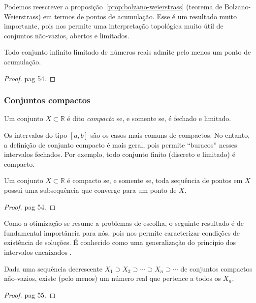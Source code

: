 Podemos reescrever a proposição~\ref{prop:bolzano-weierstrass} (teorema de Bolzano-Weierstrass) em termos de pontos de acumulação. Esse é um resultado muito importante, pois nos permite uma interpretação topológica muito útil de conjuntos não-vazios, abertos e limitados.

\begin{teorema}
	Todo conjunto infinito limitado de números reais admite pelo menos um ponto de acumulação.
	\begin{proof}
		\cite{elonAnalise1} pag 54.
	\end{proof}
\end{teorema}

\subsubsection{Conjuntos compactos}

\begin{definicao}
	Um conjunto $X\subset \mathbb{R}$ é dito \textit{compacto} se, e somente se, é fechado e limitado.
\end{definicao}

\begin{exemplo}
	Os intervalos do tipo $[a,b]$ são os casos mais comuns de compactos. No entanto, a definição de conjunto compacto é mais geral, pois permite ``buracos'' nesses intervalos fechados. Por exemplo, todo conjunto finito (discreto e limitado) é compacto.  
\end{exemplo}

\begin{proposicao}
	Um conjunto $X\subset \mathbb{R}$ é compacto se, e somente se, toda sequência de pontos em $X$ possui uma subsequência que converge para um ponto de $X$.
	\begin{proof}
		\cite{elonAnalise1} pag 54.
	\end{proof}	
\end{proposicao}

Como a otimização se resume a problemas de escolha, o seguinte resultado é de fundamental importância para nós, pois nos permite caracterizar condições de existência de soluções. É conhecido como uma generalização do princípio dos intervalos encaixados \cite{elonAnalise1}.

\begin{teorema}
	Dada uma sequência decrescente $X_1 \supset X_2 \supset \cdots \supset X_n\supset \cdots$ de conjuntos compactos não-vazios, existe (pelo menos) um número real que pertence a todos os $X_n$.
	\begin{proof}
		\cite{elonAnalise1} pag 55.
	\end{proof} 
\end{teorema}

